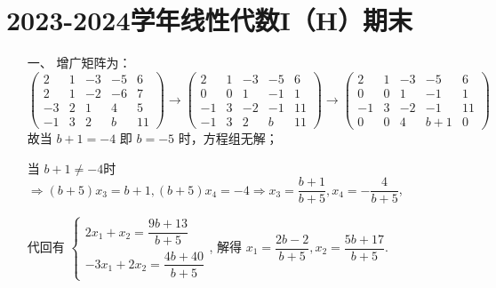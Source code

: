 \documentclass{ctexbook}
\begin{document}
\centering
\section*{2023-2024学年线性代数I（H）期末}
\begin{enumerate}
    \item[一、]增广矩阵为：
    \[
    \left(\begin{array}{cccc|c}
    2 & 1 & -3 & -5 & 6 \\
    2 & 1 & -2 & -6 & 7 \\
    -3 & 2 & 1 & 4 & 5 \\
    -1 & 3 & 2 & b & 11
    \end{array}\right) \to 
    \left(\begin{array}{cccc|c}
    2 & 1 & -3 & -5 & 6 \\
    0 & 0 & 1 & -1 & 1 \\
    -1 & 3 & -2 & -1 & 11 \\
    -1 & 3 & 2 & b & 11
    \end{array}\right) \to
    \left(\begin{array}{cccc|c}
    2 & 1 & -3 & -5 & 6 \\
    0 & 0 & 1 & -1 & 1 \\
    -1 & 3 & -2 & -1 & 11 \\
    0 & 0 & 4 & b+1 & 0
    \end{array}\right)
    \]
    故当 \(b+1=-4\) 即 \(b=-5\) 时，方程组无解；\par
    当 \(b+1\neq -4\)时 \(\Rightarrow \left(b+5\right)x_3=b+1,\left(b+5\right)x_4=-4 \Rightarrow x_3=\dfrac{b+1}{b+5},x_4=-\dfrac{4}{b+5}\),\par
    代回有 \(
            \begin{cases}
                2x_1+x_2=\dfrac{9b+13}{b+5}\\
                -3x_1+2x_2=\dfrac{4b+40}{b+5}
            \end{cases}
            \),
    解得 \(x_1=\dfrac{2b-2}{b+5},x_2=\dfrac{5b+17}{b+5}\).\par
    

\end{enumerate}
\end{document}
